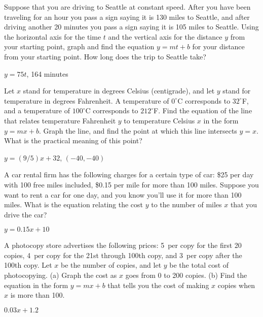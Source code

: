 \begin{exercises}
\exercise Suppose that you are driving to Seattle at constant speed.
After you have been traveling for an hour you pass a sign saying it is
130 miles to Seattle, and after driving another 20 minutes you pass a
sign saying it is 105 miles to Seattle.  Using the horizontal axis for
the time $t$ and the vertical axis for the distance $y$ from your
starting point, graph and find the equation $y=mt+b$ for your distance
from your starting point. How long does the trip to Seattle take?
\begin{answer} $y=75t$, 164 minutes
\end{answer}


\exercise
Let $x$ stand for temperature in degrees Celsius (centigrade), and let
$y$ stand for temperature in degrees Fahrenheit.  A temperature of $0^\circ$C
corresponds to $32^\circ$F, and a temperature of
$100^\circ$C corresponds to $212^\circ$F.  Find the
equation of the line that relates temperature Fahrenheit $y$ to
temperature Celsius $x$ in the form $y=mx+b$.  
Graph the line, and find the point at which this line intersects $y=x$.
What is the practical meaning of this point?
\begin{answer} $y=(9/5)x+32$, $(-40,-40)$
\end{answer}

\exercise
A car rental firm has the following charges for a certain type of car:
\$25 per day with 100 free miles included, \$0.15 per mile for more than
100 miles.  Suppose you want to rent a car for one day, and you know you'll
use it for more than 100 miles.  What is the equation relating the cost
$y$ to the number of miles $x$ that you drive the car?
\begin{answer} $y=0.15x+10$
\end{answer}

\exercise A photocopy store advertises the following prices: 5\cents~per
copy for the first 20 copies, 4\cents~per copy for the 21st through
100th copy, and 3\cents~per copy after the 100th copy.  Let $x$ be the
number of copies, and let $y$ be the total cost of photocopying.  (a)
Graph the cost as $x$ goes from 0 to 200 copies.  (b) Find the
equation in the form $y=mx+b$ that tells you the cost of making $x$
copies when $x$ is more than 100.
\begin{answer} $0.03x+1.2$
\end{answer}


\end{exercises}
